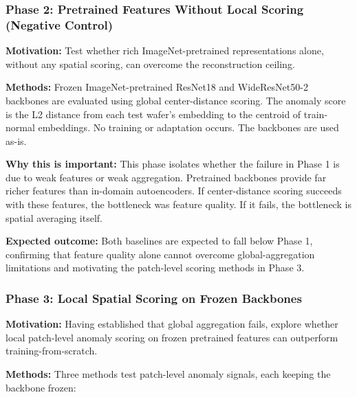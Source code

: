\documentclass[11pt]{article}
\begin{document}
\subsubsection{Phase 2: Pretrained Features Without Local Scoring (Negative Control)}

\textbf{Motivation:} Test whether rich ImageNet-pretrained representations alone, without any spatial scoring, can
overcome the reconstruction ceiling.

\textbf{Methods:} Frozen ImageNet-pretrained ResNet18 and WideResNet50-2 backbones are evaluated using global
center-distance scoring. The anomaly score is the L2 distance from each test wafer's embedding to the centroid of train-normal embeddings.
No training or adaptation occurs. The backbones are used as-is.

\textbf{Why this is important:} This phase isolates whether the failure in Phase 1 is due to weak features or weak aggregation.
Pretrained backbones provide far richer features than in-domain autoencoders. If center-distance scoring succeeds with
these features, the bottleneck was feature quality. If it fails, the bottleneck is spatial averaging itself.

\textbf{Expected outcome:} Both baselines are expected to fall below Phase 1, confirming that feature quality alone
cannot overcome global-aggregation limitations and motivating the patch-level scoring methods in Phase 3.

\subsubsection{Phase 3: Local Spatial Scoring on Frozen Backbones}

\textbf{Motivation:} Having established that global aggregation fails, explore whether local patch-level anomaly
scoring on frozen pretrained features can outperform training-from-scratch.

\textbf{Methods:} Three methods test patch-level anomaly signals, each keeping the backbone frozen:
\end{document}
